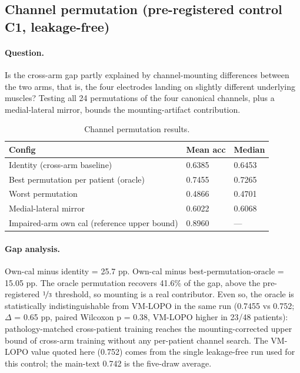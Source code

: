 \documentclass{article}
\begin{document}
\subsection{Channel permutation (pre-registered control C1, leakage-free)}
\label{app:permutation}

\paragraph{Question.} Is the cross-arm gap partly explained by channel-mounting differences between the two arms, that is, the four electrodes landing on slightly different underlying muscles? Testing all 24 permutations of the four canonical channels, plus a medial-lateral mirror, bounds the mounting-artifact contribution.

\begin{table}[h]
  \caption{Channel permutation results.}
  \label{tab:permutation}
  \centering
  \small
  \begin{tabular}{lll}
    \toprule
    Config & Mean acc & Median \\
    \midrule
    Identity (cross-arm baseline) & 0.6385 & 0.6453 \\
    Best permutation per patient (oracle) & 0.7455 & 0.7265 \\
    Worst permutation & 0.4866 & 0.4701 \\
    Medial-lateral mirror & 0.6022 & 0.6068 \\
    Impaired-arm own cal (reference upper bound) & 0.8960 & --- \\
    \bottomrule
  \end{tabular}
\end{table}

\paragraph{Gap analysis.} Own-cal minus identity = 25.7 pp. Own-cal minus best-permutation-oracle = 15.05 pp. The oracle permutation recovers 41.6\% of the gap, above the pre-registered $\nicefrac{1}{3}$ threshold, so mounting is a real contributor. Even so, the oracle is statistically indistinguishable from VM-LOPO in the same run (0.7455 vs 0.752; $\Delta$ = 0.65 pp, paired Wilcoxon p = 0.38, VM-LOPO higher in 23/48 patients): pathology-matched cross-patient training reaches the mounting-corrected upper bound of cross-arm training without any per-patient channel search. The VM-LOPO value quoted here (0.752) comes from the single leakage-free run used for this control; the main-text 0.742 is the five-draw average.
\end{document}
